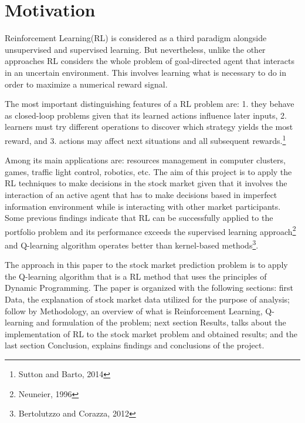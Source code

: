 \documentclass[12pt]{article}
\title{}
\author{}
\begin{document}
\maketitle

\section{Motivation}
Reinforcement Learning(RL) is considered as a third paradigm alongside unsupervised and supervised learning. But nevertheless, unlike the other approaches RL considers the whole problem of goal-directed agent that interacts in an uncertain environment. This involves learning what is necessary to do in order to maximize a numerical reward signal. 

The most important distinguishing features of a RL problem are: 1. they behave as closed-loop problems given that its learned actions influence later inputs, 2. learners must try different operations to discover which strategy yields the most reward, and 3. actions may affect next situations and all subsequent rewards.\footnote{Sutton and Barto, 2014}

Among its main applications are: resources management in computer clusters, games, traffic light control, robotics, etc. The aim of this project is to apply the RL techniques to make decisions in the stock market given that it involves the interaction of an active agent that has to make decisions based in imperfect information environment while is interacting with other market participants. Some previous findings indicate that RL can be successfully applied to the portfolio problem and its performance exceeds the supervised learning approach\footnote{Neuneier, 1996} and Q-learning algorithm operates better than kernel-based methods\footnote{Bertolutzzo and Corazza, 2012}.

The approach in this paper to the stock market prediction problem is to apply the Q-learning algorithm that is a RL method that uses the principles of Dynamic Programming. The paper is organized with the following sections: first Data, the explanation of stock market data utilized for the purpose of analysis; follow by Methodology, an overview of what is Reinforcement Learning, Q-learning and formulation of the problem; next section Results, talks about the implementation of RL to the stock market problem and obtained results; and the last section Conclusion, explains findings and conclusions of the project.  
\end{document}
